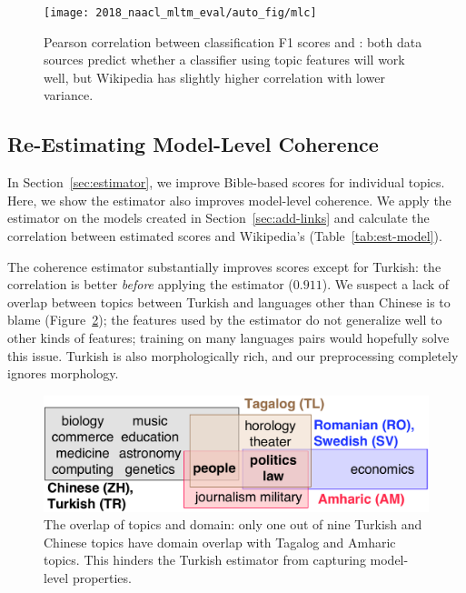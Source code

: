 \begin{figure}[t!]
	\centering
	\texttt{[image: 2018\_naacl\_mltm\_eval/auto\_fig/mlc]}
	\caption{Pearson correlation between classification F1 scores
		and \cnpmi{}: both \cnpmi{} data sources predict whether a
		classifier using topic features will work well, but
		Wikipedia has slightly higher correlation with lower variance.}
	\label{fig:mlc}
\end{figure}



\subsection{Re-Estimating Model-Level Coherence}

In Section~\ref{sec:estimator}, we improve Bible-based \cnpmi{} scores
for individual topics.  Here, we show the estimator also improves
model-level coherence.  We apply the estimator on the models created
in Section~\ref{sec:add-links} and calculate the correlation between
estimated scores and Wikipedia's \cnpmi{} (Table~\ref{tab:est-model}).

The coherence estimator substantially improves scores except for
Turkish: the correlation is better \emph{before} applying the
estimator ($0.911$). We suspect a lack of overlap between topics
between Turkish and languages other than Chinese is to blame
(Figure~\ref{fig:overlap}); the features used by the estimator do not
generalize well to other kinds of features; training on many languages
pairs would hopefully solve this issue.  Turkish is also
morphologically rich, and our preprocessing completely ignores
morphology.



\begin{figure}[t!]
  \centering
  \includegraphics[width=\linewidth]{2018_naacl_mltm_eval/figures/overlap}
  \caption{The overlap of topics and domain: only one out of nine
    Turkish and Chinese topics have domain overlap with Tagalog and
    Amharic topics.  This hinders the Turkish estimator from capturing
    model-level properties.}
	\label{fig:overlap}
\end{figure}


